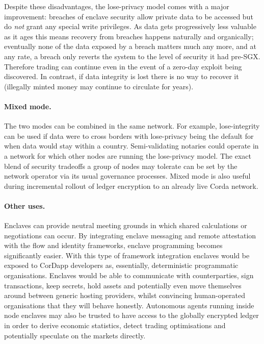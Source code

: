 \documentclass{article}
\begin{document}
Despite these disadvantages, the lose-privacy model comes with a major improvement: breaches of enclave security
allow private data to be accessed but do \emph{not} grant any special write privileges. As data gets progressively
less valuable as it ages this means recovery from breaches happens naturally and organically; eventually none of
the data exposed by a breach matters much any more, and at any rate, a breach only reverts the system to the level
of security it had pre-SGX. Therefore trading can continue even in the event of a zero-day exploit being
discovered. In contrast, if data integrity is lost there is no way to recover it (illegally minted money may
continue to circulate for years).

\paragraph{Mixed mode.}The two modes can be combined in the same network. For example, lose-integrity can be used
if data were to cross borders with lose-privacy being the default for when data would stay within a country.
Semi-validating notaries could operate in a network for which other nodes are running the lose-privacy model. The
exact blend of security tradeoffs a group of nodes may tolerate can be set by the network operator via its usual
governance processes. Mixed mode is also useful during incremental rollout of ledger encryption to an already live
Corda network.

\paragraph{Other uses.}Enclaves can provide neutral meeting grounds in which shared calculations or negotiations
can occur. By integrating enclave messaging and remote attestation with the flow and identity frameworks, enclave
programming becomes significantly easier. With this type of framework integration enclaves would be exposed to
CorDapp developers as, essentially, deterministic programmatic organisations. Enclaves would be able to communicate
with counterparties, sign transactions, keep secrets, hold assets and potentially even move themselves around
between generic hosting providers, whilst convincing human-operated organisations that they will behave honestly.
Autonomous agents running inside node enclaves may also be trusted to have access to the globally encrypted ledger
in order to derive economic statistics, detect trading optimisations and potentially speculate on the markets
directly.
\end{document}
